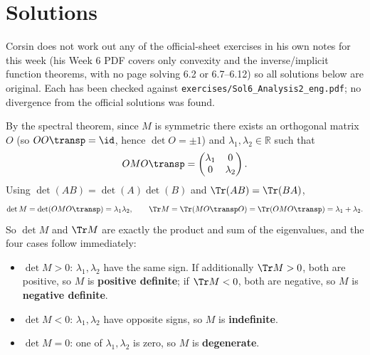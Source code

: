 \section{Solutions}
\label{sec:week06_solutions}

\begin{ainote}
Corsin does not work out any of the official-sheet exercises in his own notes for this week (his
Week 6 PDF covers only convexity and the inverse/implicit function theorems, with no page solving
6.2 or 6.7--6.12) so all solutions below are original. Each has been checked against
\texttt{exercises/Sol6\_Analysis2\_eng.pdf}; no divergence from the official solutions was found.
\end{ainote}

\begin{exercisesolution}
By the spectral theorem, since $M$ is symmetric there exists an orthogonal matrix $O$
(so $OO\transp = \id$, hence $\det O = \pm 1$) and $\lambda_1, \lambda_2 \in \mathbb{R}$ such that
\[OMO\transp = \begin{pmatrix} \lambda_1 & 0 \\ 0 & \lambda_2 \end{pmatrix}.\]
Using $\det(AB) = \det(A)\det(B)$ and $\Tr(AB) = \Tr(BA)$,
\[\det M = \det(OMO\transp) = \lambda_1\lambda_2, \qquad \Tr M = \Tr(MO\transp O) = \Tr(OMO\transp) = \lambda_1 + \lambda_2.\]
So $\det M$ and $\Tr M$ are exactly the product and sum of the eigenvalues, and the four cases
follow immediately:
\begin{itemize}
  \item $\det M > 0$: $\lambda_1, \lambda_2$ have the same sign. If additionally $\Tr M > 0$,
    both are positive, so $M$ is \textbf{positive definite}; if $\Tr M < 0$, both are negative,
    so $M$ is \textbf{negative definite}.
  \item $\det M < 0$: $\lambda_1, \lambda_2$ have opposite signs, so $M$ is \textbf{indefinite}.
  \item $\det M = 0$: one of $\lambda_1, \lambda_2$ is zero, so $M$ is \textbf{degenerate}.
\end{itemize}
\end{exercisesolution}

